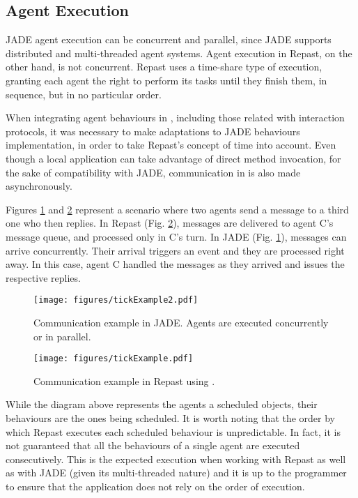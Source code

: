 \subsection{Agent Execution}

JADE agent execution can be concurrent and parallel, since JADE supports distributed and multi-threaded agent systems. Agent execution in Repast, on the other hand, is not concurrent. Repast uses a time-share type of execution, granting each agent the right to perform its tasks until they finish them, in sequence, but in no particular order.

When integrating agent behaviours in \apiname{}, including those related with interaction protocols, it was necessary to make adaptations to JADE behaviours implementation, in order to take Repast's concept of time into account. Even though a local application can take advantage of direct method invocation, for the sake of compatibility with JADE, communication in \apiname{} is also made asynchronously.

Figures \ref{fig:com-example-jade} and \ref{fig:com-example-repast} represent a scenario where two agents send a message to a third one who then replies. In Repast (Fig. \ref{fig:com-example-repast}), messages are delivered to agent C's message queue, and processed only in C's turn. In JADE (Fig. \ref{fig:com-example-jade}), messages can arrive concurrently. Their arrival triggers an event and they are processed right away. In this case, agent C handled the messages as they arrived and issues the respective replies.

\begin{figure}
	\centering
	\texttt{[image: figures/tickExample2.pdf]}
	\caption{
		Communication example in JADE. Agents are executed concurrently or in parallel. 
	}
	\label{fig:com-example-jade}
\end{figure}

\begin{figure}
	\centering
	\texttt{[image: figures/tickExample.pdf]}
	\caption{
		Communication example in Repast using \apiname{}.
	}
	\label{fig:com-example-repast}
\end{figure}

While the diagram above represents the agents a scheduled objects, their behaviours are the ones being scheduled. It is worth noting that the order by which Repast executes each scheduled behaviour is unpredictable. In fact, it is not guaranteed that all the behaviours of a single agent are executed consecutively. This is the expected execution when working with Repast as well as with JADE (given its multi-threaded nature) and it is up to the programmer to ensure that the application does not rely on the order of execution.

